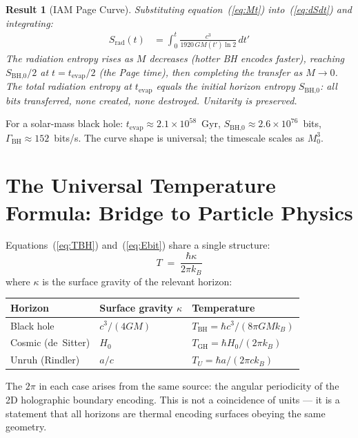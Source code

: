 \documentclass[12pt,letterpaper]{article}
\newtheorem{result}{Result}
\begin{document}
\begin{result}[IAM Page Curve]
Substituting equation~(\ref{eq:Mt}) into~(\ref{eq:dSdt}) and integrating:
\begin{align}
S_\text{rad}(t) &= \int_0^t \frac{c^3}{1920\,G M(t')\ln 2}\,dt'
\label{eq:Srad}
\end{align}
The radiation entropy rises as $M$ decreases (hotter BH encodes faster),
reaching $S_\text{BH,0}/2$ at $t = t_\text{evap}/2$ (the Page time),
then completing the transfer as $M \to 0$.
The total radiation entropy at $t_\text{evap}$ equals the initial
horizon entropy $S_\text{BH,0}$: all bits transferred, none created,
none destroyed. Unitarity is preserved.
\end{result}

For a solar-mass black hole: $t_\text{evap} \approx 2.1\times10^{58}$~Gyr,
$S_\text{BH,0} \approx 2.6\times10^{76}$~bits,
$\Gamma_\text{BH} \approx 152$~bits/s.
The curve shape is universal; the timescale scales as $M_0^3$.

\section{The Universal Temperature Formula: Bridge to Particle Physics}

Equations~(\ref{eq:TBH}) and~(\ref{eq:Ebit}) share a single structure:
\begin{equation}
T \;=\; \frac{\hbar\kappa}{2\pi k_B}
\label{eq:Tuniversal}
\end{equation}
where $\kappa$ is the surface gravity of the relevant horizon:
\begin{center}
\begin{tabular}{lll}
\toprule
Horizon & Surface gravity $\kappa$ & Temperature \\
\midrule
Black hole & $c^3/(4GM)$ & $T_\text{BH} = \hbar c^3/(8\pi GMk_B)$ \\
Cosmic (de~Sitter) & $H_0$ & $T_\text{GH} = \hbar H_0/(2\pi k_B)$ \\
Unruh (Rindler) & $a/c$ & $T_U = \hbar a/(2\pi ck_B)$ \\
\bottomrule
\end{tabular}
\end{center}

The $2\pi$ in each case arises from the same source: the angular
periodicity of the 2D holographic boundary encoding.
This is not a coincidence of units --- it is a statement that
all horizons are thermal encoding surfaces obeying the same geometry.
\end{document}
